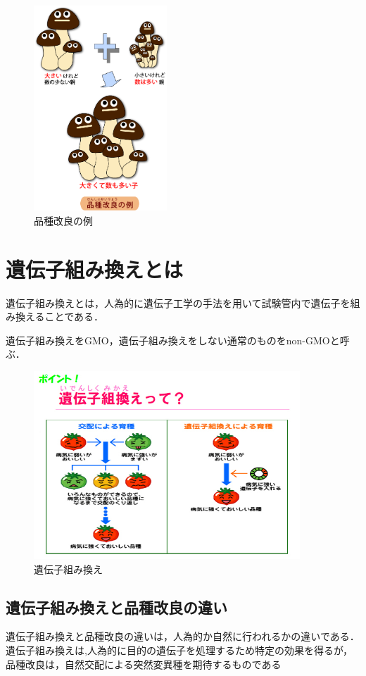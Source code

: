 \begin{figure}[htb]
\centering
\includegraphics[width=5cm]{kinoko8.png}
\caption{品種改良の例}\label{図}
\end{figure}

\section{遺伝子組み換えとは}
遺伝子組み換えとは，人為的に遺伝子工学の手法を用いて試験管内で遺伝子を組み換えることである．

遺伝子組み換えをGMO，遺伝子組み換えをしない通常のものをnon-GMOと呼ぶ．\cite{kinoko2015}

\begin{figure}[htb]
\centering
\includegraphics[width=10cm]{iden.jpg}
\caption{遺伝子組み換え}\label{図}
\end{figure}

\subsection{遺伝子組み換えと品種改良の違い}
遺伝子組み換えと品種改良の違いは，人為的か自然に行われるかの違いである．遺伝子組み換えは,人為的に目的の遺伝子を処理するため特定の効果を得るが，品種改良は，自然交配による突然変異種を期待するものである

